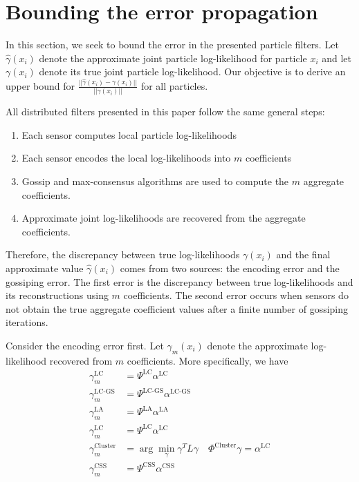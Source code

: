 \documentclass[10pt,letterpaper,final]{article}
\begin{document}
%

\section{Bounding the error propagation}
In this section, we seek to bound the error in the presented particle filters. Let $\hat{\gamma}(x_i)$ denote the approximate joint particle log-likelihood for particle $x_i$ and let $\gamma(x_i)$ denote its true joint particle log-likelihood. Our objective is to derive an upper bound for $\frac{||\hat{\gamma}(x_i)-\gamma(x_i)||}{||\gamma(x_i)||}$ for all particles.

All distributed filters presented in this paper follow the same general steps:
\begin{enumerate}
\item Each sensor computes local particle log-likelihoods
\item Each sensor encodes the local log-likelihoods into $m$ coefficients
\item Gossip and max-consensus algorithms are used to compute the $m$ aggregate coefficients. 
\item Approximate joint log-likelihoods are recovered from the aggregate coefficients. 
\end{enumerate}

Therefore, the discrepancy between true log-likelihoods $\gamma(x_i)$ and the final approximate value $\hat{\gamma}(x_i)$ comes from two sources: the encoding error and the gossiping error. The first error is the discrepancy between true log-likelihoods and its reconstructions using $m$ coefficients. The second error occurs when sensors do not obtain the true aggregate coefficient values after a finite number of gossiping iterations. 

Consider the encoding error first. Let $\gamma_m(x_i)$ denote the approximate log-likelihood recovered from $m$ coefficients. More specifically, we have
\begin{align}
\gamma_m^{\text{LC}} &= \Psi^{\text{LC}}\alpha^{\text{LC}} \\
\gamma_m^{\text{LC-GS}} &= \Psi^{\text{LC-GS}}\alpha^{\text{LC-GS}} \\
\gamma_m^{\text{LA}} &= \Psi^{\text{LA}}\alpha^{\text{LA}} \\
\gamma_m^{\text{LC}} &= \Psi^{\text{LC}}\alpha^{\text{LC}} \\
\gamma_m^{\text{Cluster}} &= \arg \min_{\gamma} \gamma^T L \gamma \quad \Phi^{\text{Cluster}}\gamma = \alpha^{\text{LC}} \\
\gamma_m^{\text{CSS}} &= \Psi^{\text{CSS}}\alpha^{\text{CSS}}
\end{align}
\end{document}
